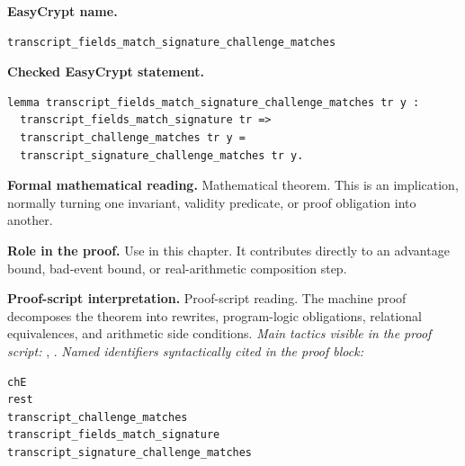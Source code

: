 \begin{formaltheorem}
\noindent\textbf{EasyCrypt name.}
\begin{lstlisting}[language=EasyCrypt,basicstyle=\ttfamily\scriptsize]
transcript_fields_match_signature_challenge_matches
\end{lstlisting}
\noindent\textbf{Checked EasyCrypt statement.}
\begin{lstlisting}[language=EasyCrypt,basicstyle=\ttfamily\scriptsize]
lemma transcript_fields_match_signature_challenge_matches tr y :
  transcript_fields_match_signature tr =>
  transcript_challenge_matches tr y =
  transcript_signature_challenge_matches tr y.
\end{lstlisting}
\noindent\textbf{Formal mathematical reading.}
Mathematical theorem. This is an implication, normally turning one invariant, validity predicate, or proof obligation into another.

\noindent\textbf{Role in the proof.}
Use in this chapter. It contributes directly to an advantage bound, bad-event bound, or real-arithmetic composition step.

\noindent\textbf{Proof-script interpretation.}
Proof-script reading. The machine proof decomposes the theorem into rewrites, program-logic obligations, relational equivalences, and arithmetic side conditions.
\emph{Main tactics visible in the proof script:} , .
\emph{Named identifiers syntactically cited in the proof block:}
\begin{lstlisting}[language=EasyCrypt,basicstyle=\ttfamily\scriptsize]
chE
rest
transcript_challenge_matches
transcript_fields_match_signature
transcript_signature_challenge_matches
\end{lstlisting}

\end{formaltheorem}

